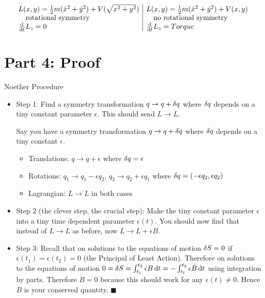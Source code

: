 \documentclass{article}
\begin{document}
\[
    \begin{array}{l|l}
        L(x,y)=\frac{1}{2}m(\dot{x}^2+\dot{y}^2)+V(\sqrt{x^2+y^2}) & L(x,y)=\frac{1}{2}m(\dot{x}^2+\dot{y}^2)+V(x,y) \\
        \qq{rotational symmetry}                                   & \qq{no rotational symmetry}                     \\
        \dv{t}L_z=0                                                & \dv{t}L_z = Torque
    \end{array}
\]

\section*{Part 4: Proof}

Noether Procedure

\begin{itemize}
    \item Step 1: Find a symmetry transformation $q\to q+\var q$ where $\var q$ depends on a tiny constant parameter $\epsilon$. This should send $L\to L$.

          Say you have a symmetry transformation $q\to q+\var q$ where $\var q$ depends on a tiny constant $\epsilon$.
          \begin{itemize}
              \item Translations: $q\to q+\epsilon$ where $\var q=\epsilon$
              \item Rotations: $q_1\to q_1-\epsilon q_2$, $q_2\to q_2+\epsilon q_1$ where $\var q=(-\epsilon q_2,\epsilon q_2) $
              \item Lagrangian: $L\to L$ in both cases
          \end{itemize}
    \item Step 2 (the clever step, the crucial step): Make the tiny constant parameter $\epsilon$ into a tiny time dependent parameter $\epsilon(t)$. You should now find that instead of $L\to L$ as before, now $L\to L+\dot{\epsilon}B$.
    \item Step 3: Recall that on solutions to the equations of motion $\var S=0$ if $\epsilon(t_1)=\epsilon(t_2)=0$ (the Principal of Least Action). Therefore on solutions to the equations of motion $0=\var S=\int_{t_1}^{t_2}\dot{\epsilon}B\dd{t}=-\int_{t_1}^{t_2}\epsilon\dot{B}\dd{t}$ using integration by parts. Therefore $\dot{B}=0$ because this should work for any $\epsilon(t)\neq 0$. Hence $B$ is your conserved quantity. $\blacksquare$
\end{itemize}
\end{document}
